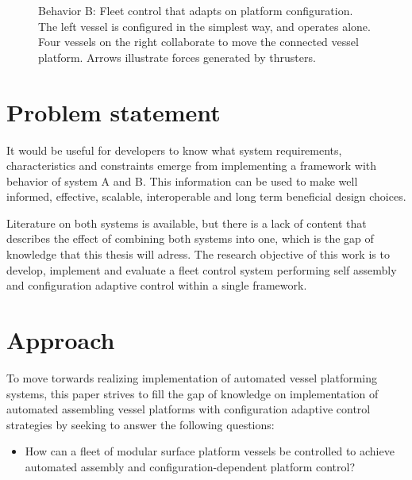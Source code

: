 \begin{figure}[h!]
{\begin{minipage}{0.45\textwidth}
			\caption{Behavior B: Fleet control that adapts on platform configuration. The left vessel is configured in the simplest way, and operates alone. Four vessels on the right collaborate to move the connected vessel platform. Arrows illustrate forces generated by thrusters. }
			\label{exaB}
		\end{minipage}
	}
\end{figure}

\section{Problem statement}
It would be useful for developers to know what system requirements, characteristics and constraints emerge from implementing a framework with behavior of system A and B. This information can be used to make well informed, effective, scalable, interoperable and long term beneficial design choices. 

Literature on both systems is available, but there is a lack of content that describes the effect of combining both systems into one, which is the gap of knowledge that this thesis will adress. The research objective of this work is to develop, implement and evaluate a fleet control system performing self assembly and configuration adaptive control within a single framework. 

\section{Approach}
To move torwards realizing implementation of automated vessel platforming systems, this paper strives to fill the gap of knowledge on implementation of automated assembling vessel platforms with configuration adaptive control strategies by seeking to answer the following questions:\\

\begin{itemize}
	\item How can a fleet of modular surface platform vessels be controlled to achieve automated assembly and configuration-dependent platform control?
\end{itemize}


